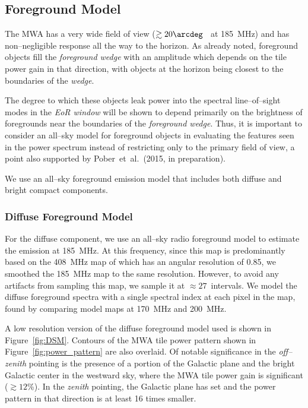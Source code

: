 \documentclass[preprint2,iop,numberedappendix]{emulateapj}
\begin{document}
\subsection{Foreground Model}\label{sec:foreground}

The MWA has a very wide field of view ($\gtrsim 20\arcdeg$~ at 185~MHz) and has non--negligible response all the way to the horizon. As already noted, foreground objects fill the {\it foreground wedge} with an amplitude which depends on the tile power gain in that direction, with objects at the horizon being closest to the boundaries of the {\it wedge}. 

The degree to which these objects leak power into the spectral line--of--sight modes in the {\it EoR window} will be shown to depend primarily on the brightness of foregrounds near the boundaries of the {\it foreground wedge}. Thus, it is important to consider an all--sky model for foreground objects in evaluating the features seen in the power spectrum instead of restricting only to the primary field of view, a point also supported by Pober~et~al.~(2015, in preparation). 

We use an all--sky foreground emission model that includes both diffuse and bright compact components.  

\subsubsection{Diffuse Foreground Model}\label{sec:DSM}

For the diffuse component, we use an all--sky radio foreground model \citep{deo08} to estimate the emission at 185~MHz. At this frequency, since this map is predominantly based on the 408~MHz map of \citet{has82} which has an angular resolution of 0.85\arcdeg, we smoothed the 185~MHz map to the same resolution. However, to avoid any artifacts from sampling this map, we sample it at $\approx 27$\arcmin~intervals. We model the diffuse foreground spectra with a single spectral index at each pixel in the map, found by comparing model maps at 170~MHz and 200~MHz.

A low resolution version of the diffuse foreground model used is shown in Figure~\ref{fig:DSM}. Contours of the MWA tile power pattern shown in Figure~\ref{fig:power_pattern} are also overlaid. Of notable significance in the {\it off--zenith} pointing is the presence of a portion of the Galactic plane and the bright Galactic center in the westward sky, where the MWA tile power gain is significant ($\gtrsim 12$\%). In the {\it zenith} pointing, the Galactic plane has set and the power pattern in that direction is at least 16 times smaller. 
\end{document}
